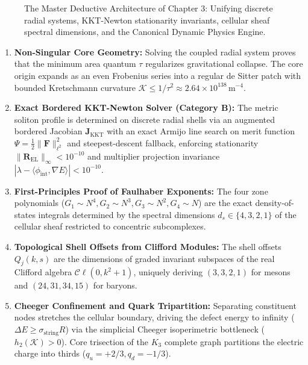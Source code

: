 \documentclass[
    12pt,
    a4paper,
    headings=normal,
    twoside=false,
    open=any,
    parskip=half
]{scrbook}
\begin{document}
\begin{figure}[htbp]
\caption{The Master Deductive Architecture of Chapter 3: Unifying discrete radial systems, KKT-Newton stationarity invariants, cellular sheaf spectral dimensions, and the Canonical Dynamic Physics Engine.}
\label{fig:ch3_master_deductive_architecture_flow}
\end{figure}

\begin{tcolorbox}[colback=maincolor!3!white, colframe=maincolor!80!black, title={\textbf{Grand Synthesis of Chapter 3}}]
\begin{enumerate}[leftmargin=1.5em, itemsep=5pt]
    \item \textbf{Non-Singular Core Geometry:} Solving the coupled radial system proves that the minimum area quantum $\tau$ regularizes gravitational collapse. The core origin expands as an even Frobenius series into a regular de Sitter patch with bounded Kretschmann curvature $\mathcal{K} \le 1/\tau^2 \approx 2.64 \times 10^{138}\,\text{m}^{-4}$.
    \item \textbf{Exact Bordered KKT-Newton Solver (Category B):} The metric soliton profile is determined on discrete radial shells via an augmented bordered Jacobian $\mathbf{J}_{\text{KKT}}$ with an exact Armijo line search on merit function $\Psi = \frac{1}{2}\|\mathbf{F}\|_{\ell^2}^2$ and steepest-descent fallback, enforcing stationarity $\|\mathbf{R}_{\text{EL}}\|_\infty < 10^{-10}$ and multiplier projection invariance $|\lambda - \langle\phi_{\text{int}}, \nabla E\rangle| < 10^{-10}$.
    \item \textbf{First-Principles Proof of Faulhaber Exponents:} The four zone polynomials ($G_1 \sim N^4, G_2 \sim N^3, G_3 \sim N^2, G_4 \sim N$) are the exact density-of-states integrals determined by the spectral dimensions $d_s \in \{4, 3, 2, 1\}$ of the cellular sheaf restricted to concentric subcomplexes.
    \item \textbf{Topological Shell Offsets from Clifford Modules:} The shell offsets $Q_j(k, s)$ are the dimensions of graded invariant subspaces of the real Clifford algebra $\mathcal{C}\ell(0, k^2+1)$, uniquely deriving $(3, 3, 2, 1)$ for mesons and $(24, 31, 34, 15)$ for baryons.
    \item \textbf{Cheeger Confinement and Quark Tripartition:} Separating constituent nodes stretches the cellular boundary, driving the defect energy to infinity ($\Delta E \ge \sigma_{\text{string}} R$) via the simplicial Cheeger isoperimetric bottleneck ($h_2(\mathcal{K}) > 0$). Core trisection of the $K_3$ complete graph partitions the electric charge into thirds ($q_u = +2/3, q_d = -1/3$).

\end{enumerate}
\end{tcolorbox}
\end{document}
